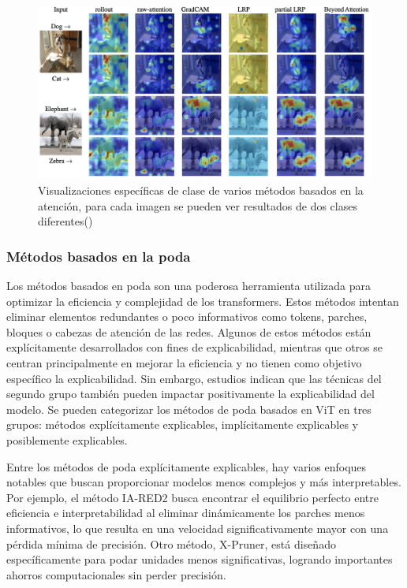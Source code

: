 \begin{figure}[H]
	\begin{center}
		\includegraphics[width=1\textwidth]{2/figures/vt4.jpeg}
		\caption{ Visualizaciones específicas de clase de varios métodos basados en la atención, para cada imagen se pueden ver resultados de dos clases diferentes(\cite{tecnica1})}
	\end{center}
\end{figure}

\subsubsection{ Métodos basados en la poda} 
Los métodos basados en poda son una poderosa herramienta utilizada para optimizar la eficiencia y complejidad de los transformers. Estos métodos intentan eliminar elementos redundantes o poco informativos como tokens, parches, bloques o cabezas de atención de las redes. Algunos de estos métodos están explícitamente desarrollados con fines de explicabilidad, mientras que otros se centran principalmente en mejorar la eficiencia y no tienen como objetivo específico la explicabilidad. Sin embargo, estudios indican que las técnicas del segundo grupo también pueden impactar positivamente la explicabilidad del modelo. Se pueden categorizar los métodos de poda basados en ViT en tres grupos: métodos explícitamente explicables, implícitamente explicables y posiblemente explicables.

Entre los métodos de poda explícitamente explicables, hay varios enfoques notables que buscan proporcionar modelos menos complejos y más interpretables. Por ejemplo, el método IA-RED2 busca encontrar el equilibrio perfecto entre eficiencia e interpretabilidad al eliminar dinámicamente los parches menos informativos, lo que resulta en una velocidad significativamente mayor con una pérdida mínima de precisión. Otro método, X-Pruner, está diseñado específicamente para podar unidades menos significativas, logrando importantes ahorros computacionales sin perder precisión.

